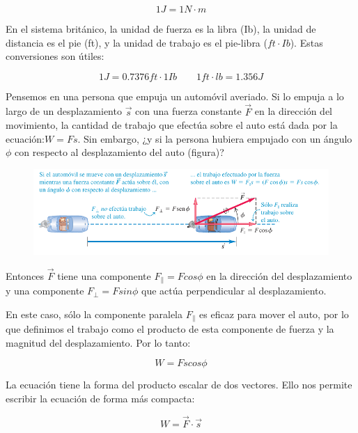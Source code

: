 \documentclass{article}
\begin{document}
    \[1 J = 1 N \cdot m\]

    \par En el sistema británico, la unidad de fuerza es la libra (Ib), la unidad de distancia es el pie (ft), y la unidad de trabajo es el pie-libra ($ft \cdot Ib$). Estas conversiones son útiles:

    \[1 J =  0.7376 ft \cdot 1Ib \quad \quad  1 ft \cdot lb = 1.356 J\]

    \vspace{0.5cm}

    \par Pensemos en una persona que empuja un automóvil averiado. Si lo empuja a lo largo de un desplazamiento $\vec{s}$ con una fuerza constante $\vec{F}$ en la dirección del movimiento, la cantidad de trabajo que efectúa sobre el auto está dada por la ecuación:$W = Fs$. Sin embargo, ¿y si la persona hubiera empujado con un ángulo $\phi$ con respecto al desplazamiento del auto (figura)?

    \begin{figure}[H]
        \centering
        \includegraphics[width=\textwidth]{img/5.1-1.png}
        
    \end{figure}
    
    \par Entonces $\vec{F}$ tiene una componente $F_{\parallel} = F cos \phi$ en la dirección del desplazamiento y una componente $F_{\perp} = F sin \phi$ que actúa perpendicular al desplazamiento.

    \par En este caso, sólo la componente paralela $F_{\parallel}$ es eficaz para mover el auto, por lo que definimos el trabajo como el producto de esta componente de fuerza y la magnitud del desplazamiento. Por lo tanto:

    \[W = Fs cos \phi \]

    \par La ecuación tiene la forma del producto escalar de dos vectores. Ello nos permite escribir la ecuación de forma más compacta:

    \[W = \vec{F} \cdot \vec{s}\]
\end{document}
